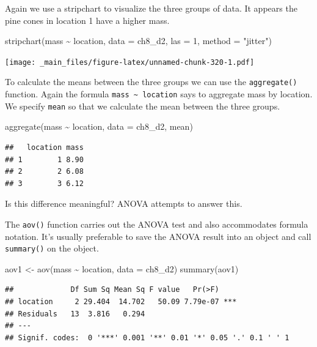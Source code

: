 \documentclass[
]{book}
\newenvironment{Shaded}{\begin{snugshade}}{\end{snugshade}}
\newcommand{\AttributeTok}[1]{\textcolor[rgb]{0.77,0.63,0.00}{#1}}
\newcommand{\DecValTok}[1]{\textcolor[rgb]{0.00,0.00,0.81}{#1}}
\newcommand{\FunctionTok}[1]{\textcolor[rgb]{0.00,0.00,0.00}{#1}}
\newcommand{\NormalTok}[1]{#1}
\newcommand{\OtherTok}[1]{\textcolor[rgb]{0.56,0.35,0.01}{#1}}
\newcommand{\SpecialCharTok}[1]{\textcolor[rgb]{0.00,0.00,0.00}{#1}}
\newcommand{\StringTok}[1]{\textcolor[rgb]{0.31,0.60,0.02}{#1}}
\begin{document}
Again we use a stripchart to visualize the three groups of data. It appears the pine cones in location 1 have a higher mass.

\begin{Shaded}
\begin{Highlighting}[]
\FunctionTok{stripchart}\NormalTok{(mass }\SpecialCharTok{\textasciitilde{}}\NormalTok{ location, }\AttributeTok{data =}\NormalTok{ ch8\_d2, }\AttributeTok{las =} \DecValTok{1}\NormalTok{, }\AttributeTok{method =} \StringTok{"jitter"}\NormalTok{)}
\end{Highlighting}
\end{Shaded}

\texttt{[image: \_main\_files/figure-latex/unnamed-chunk-320-1.pdf]}

To calculate the means between the three groups we can use the \texttt{aggregate()} function. Again the formula \texttt{mass\ \textasciitilde{}\ location} says to aggregate mass by location. We specify \texttt{mean} so that we calculate the mean between the three groups.

\begin{Shaded}
\begin{Highlighting}[]
\FunctionTok{aggregate}\NormalTok{(mass }\SpecialCharTok{\textasciitilde{}}\NormalTok{ location, }\AttributeTok{data =}\NormalTok{ ch8\_d2, mean)}
\end{Highlighting}
\end{Shaded}

\begin{verbatim}
##   location mass
## 1        1 8.90
## 2        2 6.08
## 3        3 6.12
\end{verbatim}

Is this difference meaningful? ANOVA attempts to answer this.

The \texttt{aov()} function carries out the ANOVA test and also accommodates formula notation. It's usually preferable to save the ANOVA result into an object and call \texttt{summary()} on the object.

\begin{Shaded}
\begin{Highlighting}[]
\NormalTok{aov1 }\OtherTok{\textless{}{-}} \FunctionTok{aov}\NormalTok{(mass }\SpecialCharTok{\textasciitilde{}}\NormalTok{ location, }\AttributeTok{data =}\NormalTok{ ch8\_d2)}
\FunctionTok{summary}\NormalTok{(aov1)}
\end{Highlighting}
\end{Shaded}

\begin{verbatim}
##             Df Sum Sq Mean Sq F value   Pr(>F)    
## location     2 29.404  14.702   50.09 7.79e-07 ***
## Residuals   13  3.816   0.294                     
## ---
## Signif. codes:  0 '***' 0.001 '**' 0.01 '*' 0.05 '.' 0.1 ' ' 1
\end{verbatim}
\end{document}

